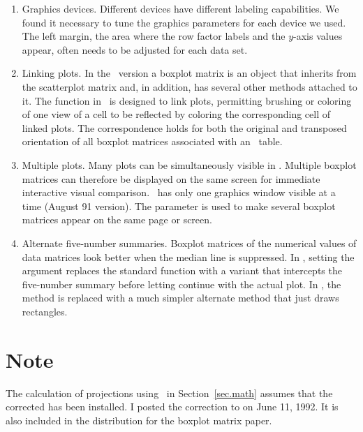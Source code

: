 \begin{enumerate}
\item Graphics devices.  Different devices have different
    labeling capabilities.  We found it necessary to tune the
    graphics parameters for each device we used.  The left
    margin, the area where the row factor labels and the
    $y$-axis values appear, often needs to be adjusted for each data
    set.

\item Linking plots.  In the \iX\ version a boxplot matrix is an
    object that inherits from the scatterplot matrix and, in
    addition, has several other methods attached to it.  The
     function in \iX\ is designed to link plots,
    permitting brushing or coloring of one view of a cell to be
    reflected by coloring the corresponding cell of linked plots.
    The correspondence holds for both the original and transposed
    orientation of all boxplot matrices associated with an
    \ANOVA\ table.

\item Multiple plots.  Many plots can be simultaneously visible
    in \iX.  Multiple boxplot matrices can therefore be displayed
    on the same screen for immediate interactive visual
    comparison.  \iS\ has only one graphics window visible at a
    time (August 91 version).  The  parameter is used to
    make several boxplot matrices appear on the same page or
    screen.

\item Alternate five-number summaries.	Boxplot matrices of the
    numerical values of data matrices look better when the median
    line is suppressed.  In \iS, setting the argument
     replaces the standard  function
    with a variant that intercepts the five-number summary before
    letting  continue with the actual plot.  In \iX, the
     method is replaced with a much simpler
    alternate method that just draws rectangles.

\end{enumerate}


\newpage
\section*{Note}

The calculation of projections using \iS\ in Section~\ref{sec.math} assumes
that the corrected  has been installed.  I posted the
correction to  on June 11, 1992.  It is also included in the
 distribution for the boxplot matrix paper.


